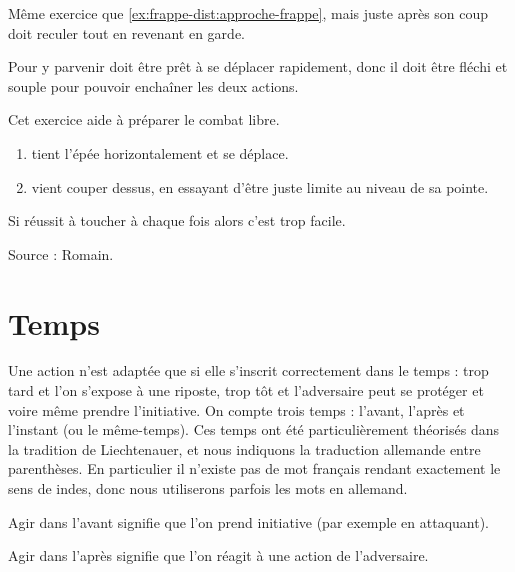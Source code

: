 \begin{exercice}
\label{ex:frappe-dist:approche-croix-aleat-garde}

Même exercice que \ref{ex:frappe-dist:approche-frappe}, mais juste après son coup \A doit reculer tout en revenant en garde.

Pour y parvenir \A doit être prêt à se déplacer rapidement, donc il doit être fléchi et souple pour pouvoir enchaîner les deux actions.

Cet exercice aide à préparer le combat libre.
\end{exercice}


\begin{exercice}

\begin{enumerate}
	\item \D tient l'épée horizontalement et se déplace.
	
	\item \A vient couper dessus, en essayant d'être juste limite au niveau de sa pointe.
\end{enumerate}

Si \A réussit à toucher à chaque fois alors c'est trop facile.

Source : Romain.
\end{exercice}


\section{Temps}



Une action n'est adaptée que si elle s'inscrit correctement dans le temps : trop tard et l'on s'expose à une riposte, trop tôt et l'adversaire peut se protéger et voire même prendre l'initiative.
On compte trois temps : l'avant, l'après et l'instant (ou le même-temps).
Ces temps ont été particulièrement théorisés dans la tradition de Liechtenauer, et nous indiquons la traduction allemande entre parenthèses.
En particulier il n'existe pas de mot français rendant exactement le sens de indes, donc nous utiliserons parfois les mots en allemand.


\begin{definition}

Agir dans l'avant signifie que l'on prend initiative (par exemple en attaquant).
\end{definition}


\begin{definition}

Agir dans l'après signifie que l'on réagit à une action de l'adversaire.
\end{definition}


